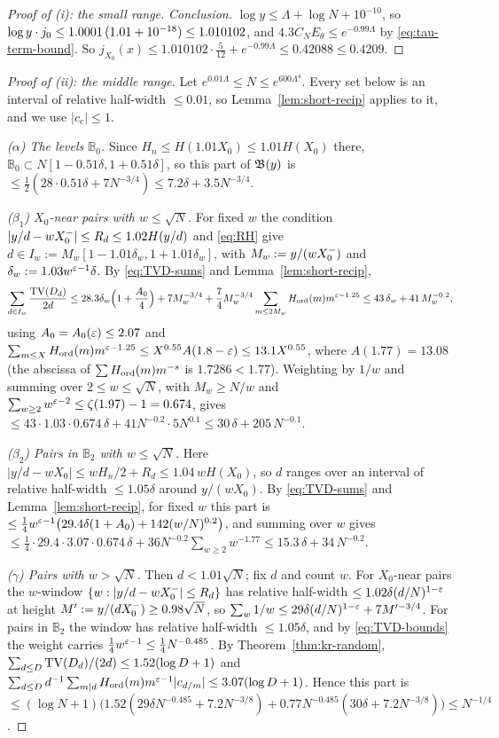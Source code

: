 \begin{proof}[Proof of (i): the small range]
\emph{Conclusion.} $\log y\le\Lambda+\log N+10^{-10}$, so $\log y\cdot j_0\le1.0001\,(1.01+10^{-18})\le1.010102$, and
$4.3C_NE_\theta\le e^{-0.99\Lambda}$ by \eqref{eq:tau-term-bound}. So $j_{X_0}(x)\le1.010102\cdot\frac5{12}+e^{-0.99\Lambda}\le0.42088\le0.4209$.
\end{proof}

\begin{proof}[Proof of (ii): the middle range]
Let $e^{0.01\Lambda}\le N\le e^{600\Lambda^4}$. Every set below is an interval of relative half-width $\le0.01$, so
Lemma~\ref{lem:short-recip} applies to it, and we use $|c_e|\le1$.

\emph{($\alpha$) The levels $\mathbb B_0$.} Since $H_n\le H(1.01X_0)\le1.01H(X_0)$ there, $\mathbb B_0\subset
N[1-0.51\delta,1+0.51\delta]$, so this part of $\mathfrak{B}(y)$ is $\le\frac12(28\cdot0.51\delta+7N^{-3/4})\le7.2\delta+3.5N^{-3/4}$.

\emph{($\beta_1$) $X_0$-near pairs with $w\le\sqrt N$.} For fixed $w$ the condition $|y/d-wX_0^{-}|\le R_d\le1.02H(y/d)$ and
\eqref{eq:RH} give $d\in I_w:=M_w[1-1.01\delta_w,1+1.01\delta_w]$, with $M_w:=y/(wX_0^{-})$ and $\delta_w:=1.03w^{\varepsilon-1}\delta$.
By \eqref{eq:TVD-sums} and Lemma~\ref{lem:short-recip},
\[
  \sum_{d\in I_w}\frac{\operatorname{TV}(D_d)}{2d}\le28.3\delta_w\Bigl(1+\frac{A_0}4\Bigr)+7M_w^{-3/4}
  +\frac74M_w^{-3/4}\sum_{m\le2M_w}H_{\mathrm{ord}}(m)m^{\varepsilon-1.25}\le43\,\delta_w+41\,M_w^{-0.2},
\]
using $A_0=A_0(\varepsilon)\le2.07$ and $\sum_{m\le X}H_{\mathrm{ord}}(m)m^{\varepsilon-1.25}\le X^{0.55}A(1.8-\varepsilon)\le13.1X^{0.55}$, where
$A(1.77)=13.08$ (the abscissa of $\sum H_{\mathrm{ord}}(m)m^{-s}$ is $1.7286<1.77$). Weighting by $1/w$ and summing over
$2\le w\le\sqrt N$, with $M_w\ge N/w$ and $\sum_{w\ge2}w^{\varepsilon-2}\le\zeta(1.97)-1=0.674$, gives
$\le43\cdot1.03\cdot0.674\,\delta+41N^{-0.2}\cdot5N^{0.1}\le30\,\delta+205\,N^{-0.1}$.

\emph{($\beta_2$) Pairs in $\mathbb B_2$ with $w\le\sqrt N$.} Here $|y/d-wX_0|\le wH_n/2+R_d\le1.04\,w H(X_0)$, so $d$
ranges over an interval of relative half-width $\le1.05\delta$ around $y/(wX_0)$. By \eqref{eq:TVD-sums} and
Lemma~\ref{lem:short-recip}, for fixed $w$ this part is
$\le\frac14w^{\varepsilon-1}\bigl(29.4\delta(1+A_0)+142(w/N)^{0.2}\bigr)$, and summing over $w$ gives
$\le\frac14\cdot29.4\cdot3.07\cdot0.674\,\delta+36N^{-0.2}\sum_{w\ge2}w^{-1.77}\le15.3\,\delta+34\,N^{-0.2}$.

\emph{($\gamma$) Pairs with $w>\sqrt N$.} Then $d<1.01\sqrt N$; fix $d$ and count $w$. For $X_0$-near pairs the
$w$-window $\{w:|y/d-wX_0^{-}|\le R_d\}$ has relative half-width $\le1.02\delta(d/N)^{1-\varepsilon}$ at height
$M':=y/(dX_0^{-})\ge0.98\sqrt N$, so $\sum_w1/w\le29\delta(d/N)^{1-\varepsilon}+7M'^{-3/4}$. For pairs in $\mathbb B_2$ the window has
relative half-width $\le1.05\delta$, and by \eqref{eq:TVD-bounds} the weight carries $\frac14w^{\varepsilon-1}\le\frac14N^{-0.485}$.
By Theorem~\ref{thm:kr-random}, $\sum_{d\le D}\operatorname{TV}(D_d)/(2d)\le1.52(\log D+1)$ and
$\sum_{d\le D}d^{-1}\sum_{m\mid d}H_{\mathrm{ord}}(m)m^{\varepsilon-1}|c_{d/m}|\le3.07(\log D+1)$. Hence this part is
$\le(\log N+1)\bigl(1.52(29\delta N^{-0.485}+7.2N^{-3/8})+0.77N^{-0.485}(30\delta+7.2N^{-3/8})\bigr)\le N^{-1/4}$.


\end{proof}
